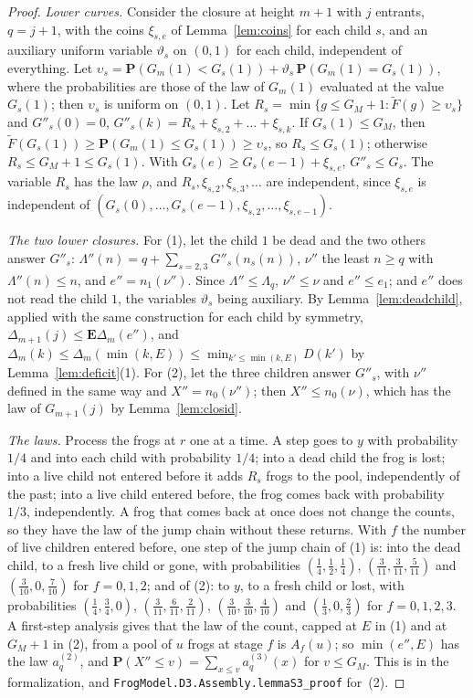 \documentclass[11pt]{amsart}
\theoremstyle{definition}
\numberwithin{equation}{section}
\newcommand{\E}{\mathbf{E}}
\renewcommand{\P}{\mathbf{P}}
\begin{document}
\begin{proof}
\emph{Lower curves.} Consider the closure at height $m+1$ with $j$ entrants, $q=j+1$, with the coins $\xi_{s,e}$ of Lemma~\ref{lem:coins} for each child $s$, and an auxiliary uniform variable $\vartheta_s$ on $(0,1)$ for each child, independent of everything. Let $\upsilon_s=\P(G_m(1)<G_s(1))+\vartheta_s\,\P(G_m(1)=G_s(1))$, where the probabilities are those of the law of $G_m(1)$ evaluated at the value $G_s(1)$; then $\upsilon_s$ is uniform on $(0,1)$. Let $R_s=\min\{g\le G_M+1:\widetilde F(g)\ge \upsilon_s\}$ and $G''_s(0)=0$, $G''_s(k)=R_s+\xi_{s,2}+\dots+\xi_{s,k}$. If $G_s(1)\le G_M$, then $\widetilde F(G_s(1))\ge\P(G_m(1)\le G_s(1))\ge \upsilon_s$, so $R_s\le G_s(1)$; otherwise $R_s\le G_M+1\le G_s(1)$. With $G_s(e)\ge G_s(e-1)+\xi_{s,e}$, $G''_s\le G_s$. The variable $R_s$ has the law $\rho$, and $R_s,\xi_{s,2},\xi_{s,3},\dots$ are independent, since $\xi_{s,e}$ is independent of $(G_s(0),\dots,G_s(e-1),\xi_{s,2},\dots,\xi_{s,e-1})$.

\emph{The two lower closures.} For (1), let the child $1$ be dead and the two others answer $G''_s$: $\Lambda''(n)=q+\sum_{s=2,3}G''_s(n_s(n))$, $\nu''$ the least $n\ge q$ with $\Lambda''(n)\le n$, and $e''=n_1(\nu'')$. Since $\Lambda''\le\Lambda_q$, $\nu''\le\nu$ and $e''\le e_1$; and $e''$ does not read the child $1$, the variables $\vartheta_s$ being auxiliary. By Lemma~\ref{lem:deadchild}, applied with the same construction for each child by symmetry, $\Delta_{m+1}(j)\le\E\Delta_m(e'')$, and $\Delta_m(k)\le\Delta_m(\min(k,E))\le\min_{k'\le\min(k,E)}D(k')$ by Lemma~\ref{lem:deficit}(1). For (2), let the three children answer $G''_s$, with $\nu''$ defined in the same way and $X''=n_0(\nu'')$; then $X''\le n_0(\nu)$, which has the law of $G_{m+1}(j)$ by Lemma~\ref{lem:closid}.

\emph{The laws.} Process the frogs at $r$ one at a time. A step goes to $y$ with probability $1/4$ and into each child with probability $1/4$; into a dead child the frog is lost; into a live child not entered before it adds $R_s$ frogs to the pool, independently of the past; into a live child entered before, the frog comes back with probability $1/3$, independently. A frog that comes back at once does not change the counts, so they have the law of the jump chain without these returns. With $f$ the number of live children entered before, one step of the jump chain of (1) is: into the dead child, to a fresh live child or gone, with probabilities $(\frac14,\frac12,\frac14)$, $(\frac3{11},\frac3{11},\frac5{11})$ and $(\frac3{10},0,\frac7{10})$ for $f=0,1,2$; and of (2): to $y$, to a fresh child or lost, with probabilities $(\frac14,\frac34,0)$, $(\frac3{11},\frac6{11},\frac2{11})$, $(\frac3{10},\frac3{10},\frac4{10})$ and $(\frac13,0,\frac23)$ for $f=0,1,2,3$. A first-step analysis gives that the law of the count, capped at $E$ in (1) and at $G_M+1$ in (2), from a pool of $u$ frogs at stage $f$ is $A_f(u)$; so $\min(e'',E)$ has the law $a^{(2)}_q$, and $\P(X''\le v)=\sum_{x\le v}a^{(3)}_q(x)$ for $v\le G_M$. This is  in the formalization, and \texttt{FrogModel.D3.Assembly.lemmaS3\_proof} for~(2).
\end{proof}
\end{document}
